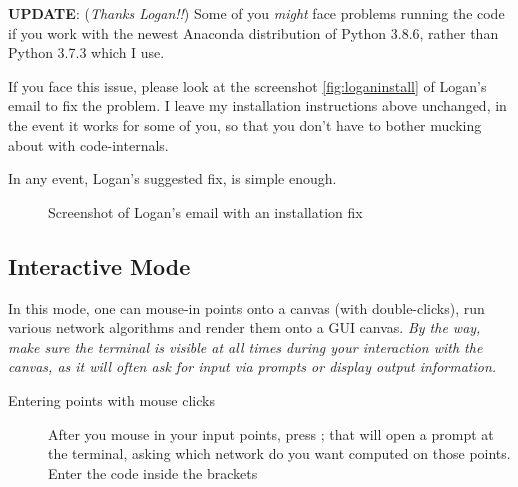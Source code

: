 \begin{appendices}
\newpage

\begin{mdframed}[backgroundcolor=black!10,rightline=false,leftline=false]
\textbf{UPDATE}: (\textit{Thanks Logan!!}) Some of you \textit{might} face problems running the code if you work with the newest Anaconda distribution
of Python 3.8.6, rather than Python 3.7.3 which I use. 

If you face this issue, please look at the screenshot \autoref{fig:loganinstall} of Logan's email to fix the problem. 
I leave my installation instructions above unchanged, in the event it works for some of you, so that you don't have to bother
mucking about with code-internals. 

In any event, Logan's suggested fix, is simple enough. 
   
\begin{figure}[H]
  \centering
  \caption{\label{fig:loganinstall} Screenshot of Logan's email with an installation fix}
\end{figure}
\end{mdframed}



\subsection{Interactive Mode}


In this mode, one can mouse-in points onto a canvas (with double-clicks), run various network algorithms 
and render them onto a GUI canvas. \textit{\footnotesize By the way, make sure the terminal is visible at all times during your 
interaction with the canvas, as it will often ask for input via prompts or display output information.}


\begin{description}
\item[Entering points with mouse clicks] After you  mouse in your input points, press ; that will open a prompt at the terminal, asking which 
network do  you want computed on those points. Enter the code inside the brackets  


\end{description}
\end{appendices}
